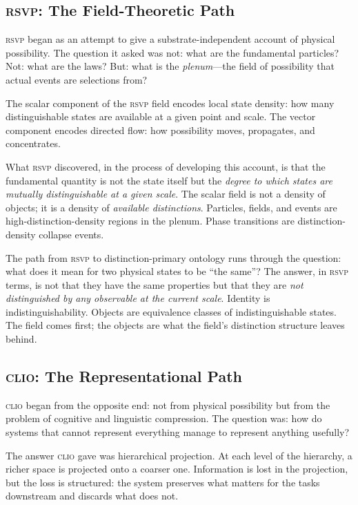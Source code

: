 \documentclass[12pt, letterpaper]{article}
\theoremstyle{remark}
\newcommand{\rsvp}{\textsc{rsvp}}
\newcommand{\clio}{\textsc{clio}}
\begin{document}
\subsection{\rsvp{}: The Field-Theoretic Path}

\rsvp{} began as an attempt to give a substrate-independent account of
physical possibility.  The question it asked was not: what are the fundamental
particles?  Not: what are the laws?  But: what is the \emph{plenum}---the
field of possibility that actual events are selections from?

The scalar component of the \rsvp{} field encodes local state density: how
many distinguishable states are available at a given point and scale.  The
vector component encodes directed flow: how possibility moves, propagates,
and concentrates.

What \rsvp{} discovered, in the process of developing this account, is that
the fundamental quantity is not the state itself but the \emph{degree to
which states are mutually distinguishable at a given scale}.  The scalar
field is not a density of objects; it is a density of \emph{available
distinctions}.  Particles, fields, and events are high-distinction-density
regions in the plenum.  Phase transitions are distinction-density collapse
events.

The path from \rsvp{} to distinction-primary ontology runs through the
question: what does it mean for two physical states to be ``the same''?
The answer, in \rsvp{} terms, is not that they have the same properties
but that they are \emph{not distinguished by any observable at the current
scale}.  Identity is indistinguishability.  Objects are equivalence classes
of indistinguishable states.  The field comes first; the objects are what
the field's distinction structure leaves behind.

\subsection{\clio{}: The Representational Path}

\clio{} began from the opposite end: not from physical possibility but from
the problem of cognitive and linguistic compression.  The question was: how
do systems that cannot represent everything manage to represent anything
usefully?

The answer \clio{} gave was hierarchical projection.  At each level of the
hierarchy, a richer space is projected onto a coarser one.  Information is
lost in the projection, but the loss is structured: the system preserves
what matters for the tasks downstream and discards what does not.
\end{document}
